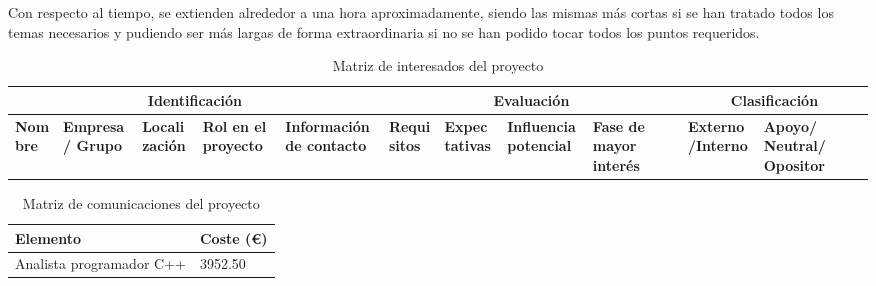 \bigskip 

Con respecto al tiempo, se extienden alrededor a una hora aproximadamente, siendo las mismas más cortas si se han tratado todos los temas necesarios y pudiendo ser más largas de forma extraordinaria si no se han podido tocar todos los puntos requeridos.

\clearpage


\begin{landscape}


\begin{table}
	\begin{adjustwidth}{-3cm}{}
	{\scriptsize
		\begin{tabular}{|p{1.5cm}|p{1.5cm}|p{1.5cm}|p{1.5cm}|p{1.5cm}|p{1.5cm}|p{1.5cm}|p{1.5cm}|p{1.5cm}|p{1.5cm}|p{1.5cm}|}
			\hline
			\multicolumn{5}{c}{Identificación} &  \multicolumn{4}{c}{Evaluación} & \multicolumn{2}{c}{Clasificación}\\
			
			\hline
			\textbf{Nombre} & \textbf{Empresa/ Grupo}  & \textbf{Localización} & \textbf{Rol en el proyecto} & \textbf{Información de contacto} & \textbf{Requisitos} & \textbf{Expectativas} & \textbf{Influencia potencial} & \textbf{Fase de mayor interés} & \textbf{Externo/Interno} & \textbf{Apoyo/ Neutral/ Opositor}\\
			
			\hline
			
		\end{tabular}
	}
		\caption{Matriz de interesados del proyecto}
		\label{tab:interesados}
	\end{adjustwidth}
\end{table}

\begin{table}
		\begin{tabular}{|l|l|}
			\hline
			\textbf{Elemento} & \textbf{Coste (\euro{})}\\
			
			\hline
			Analista programador C++ & 3952.50 \\
			
			\hline
		\end{tabular}
		\caption{Matriz de comunicaciones del proyecto}
		\label{tab:comunicacion}
\end{table}


\end{landscape}

